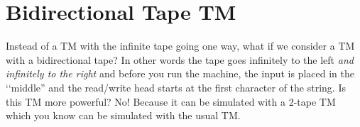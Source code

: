 \section{Bidirectional Tape TM}

Instead of a TM with the infinite tape going one way, what if we
consider a TM with a bidirectional tape? In other words the tape
goes infinitely to the left \textit{and infinitely to the right}
and before you run the
machine, the input is placed in the \lq\lq middle'' and the read/write head
starts at the first character of the string. Is this TM more
powerful? No! Because it can be simulated with a 2-tape TM which you know
can be simulated with the usual TM.

